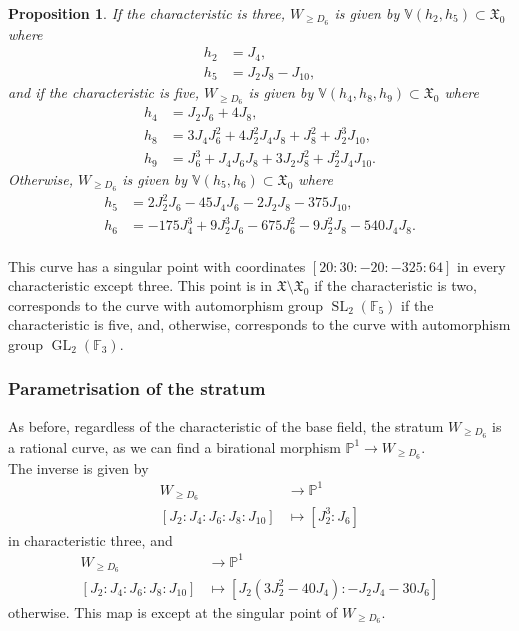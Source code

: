 \documentclass{amsart}
\newcommand{\GL}{\operatorname{GL}}
\newcommand{\SL}{\operatorname{SL}}
\numberwithin{equation}{section}
\newtheorem{proposition}[theorem]{Proposition}
\theoremstyle{definition}
\theoremstyle{remark}
\begin{document}
\begin{proposition} \label{D6_prop}
If the characteristic is three, $W_{\geq D_6}$ is given by $\mathbb{V}(h_{2},h_{5})\subset\mathfrak{X}_0$ where
\begin{align*}
h_2&=J_4,\\
h_5&=J_2J_8-J_{10},
\end{align*}
and if the characteristic is five, $W_{\geq D_6}$ is given by $\mathbb{V}(h_{4},h_{8}, h_9)\subset\mathfrak{X}_0$ where
\begin{align*}
h_4&= J_2J_6 + 4J_8,\\
h_8&=3J_4J_6^2 + 4J_2^2J_4J_8 + J_8^2 + J_2^3J_{10},\\
h_9&=J_6^3 + J_4J_6J_8 + 3J_2J_8^2 + J_2^2J_4J_{10}.
\end{align*}
Otherwise, $W_{\geq D_6}$ is given by $\mathbb{V}(h_{5},h_{6})\subset\mathfrak{X}_0$ where
\begin{align*}
h_5&=2J_2^2J_6 - 45J_4J_6 - 2J_2J_8 - 375J_{10},\\
h_6&=-175J_4^3 + 9J_2^3J_6 - 675J_6^2 - 9J_2^2J_8 - 540J_4J_8.\\
\end{align*}
\end{proposition}
This curve has a singular point with coordinates $[20: 30: -20: -325: 64]$ in every characteristic except three. This point is in $\mathfrak{X}\setminus\mathfrak{X}_0$ if the characteristic is two, corresponds to the curve with automorphism group $\SL_2(\mathbb{F}_5)$ if the characteristic is five, and, otherwise, corresponds to the curve with automorphism group $\GL_2(\mathbb{F}_3)$.\\

\subsubsection{Parametrisation of the stratum}
As before, regardless of the characteristic of the base field, the stratum $W_{\geq D_6}$ is a rational curve, as we can find a birational morphism $\mathbb{P}^1\rightarrow W_{\geq D_6}$.\\


The inverse is given by 
\begin{align*}
W_{\geq D_6} &\longrightarrow \mathbb{P}^1\\
[J_2:J_4:J_6:J_8:J_{10}]&\longmapsto[J_2^3: J_6]
\end{align*}
in characteristic three, and 
\begin{align*}
W_{\geq D_6} &\longrightarrow \mathbb{P}^1\\
[J_2:J_4:J_6:J_8:J_{10}]&\longmapsto[J_2(3J_2^2 - 40J_4): -J_2J_4 - 30J_6]
\end{align*}
otherwise. This map is except at the singular point of $W_{\geq D_6}$.\\
\end{document}
